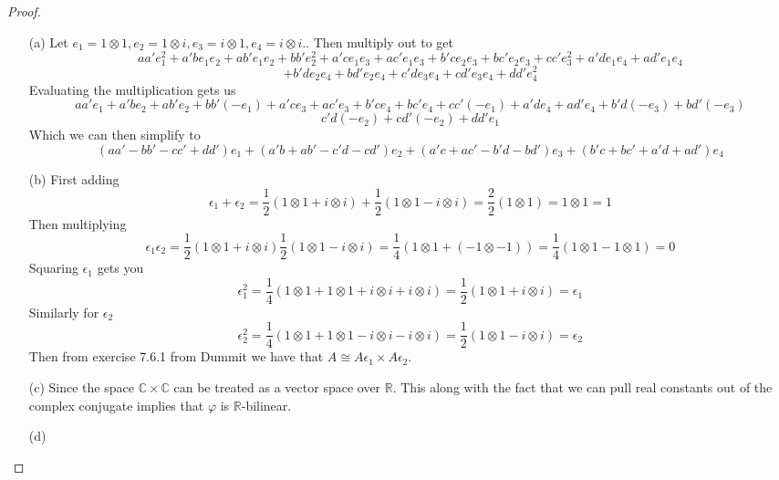 \documentclass[10pt]{article}
\newcommand{\bb}[1]{\mathbb{#1}}
\theoremstyle{plain}
\theoremstyle{remark}
\begin{document}
\begin{proof}
  \begin{enumerate}
  \item[(a)] Let $e_1=1\otimes 1, e_2=1\otimes i, e_3= i\otimes 1, e_4 = i\otimes i. $. Then multiply out to get
    \[
      a a' e_{1}^{2} + a' b e_{1} e_{2} + a b' e_{1} e_{2} + b b' e_{2}^{2} + a' c e_{1} e_{3} + a c' e_{1} e_{3} + b' c e_{2} e_{3} + b c' e_{2} e_{3} + c c' e_{3}^{2} + a' d e_{1} e_{4} + a d' e_{1} e_{4}
    \]
    \[
      + b' d e_{2} e_{4} + b d' e_{2} e_{4} + c' d e_{3} e_{4} + c d' e_{3} e_{4} + d d' e_{4}^{2}
    \]
    Evaluating the multiplication gets us
    \[
      aa'e_1+a'be_2+ab'e_2 +bb'(-e_1)+a'ce_3+ac'e_3+b'ce_4+bc'e_4+cc'(-e_1)+a'de_4+ad'e_4+b'd(-e_3)+bd'(-e_3)
    \]
    \[
      c'd(-e_2)+cd'(-e_2)+dd'e_1
    \]
    Which we can then simplify to
    \[
      (aa'-bb'-cc'+dd')e_1+(a'b+ab'-c'd-cd')e_2+(a'c+ac'-b'd-bd')e_3+(b'c+bc'+a'd+ad')e_4
    \]
  \item[(b)] First adding
    \[
      \epsilon_1+\epsilon_2=\frac{1}{2}(1\otimes 1+i\otimes i)+\frac{1}{2}(1\otimes 1-i\otimes i)=\frac{2}{2}(1\otimes 1)=1\otimes 1=1
    \]
    Then multiplying
    \[
      \epsilon_1 \epsilon_2=\frac{1}{2}(1\otimes 1+i\otimes i)\frac{1}{2}(1\otimes 1-i\otimes i)=\frac{1}{4}(1\otimes 1+(-1\otimes -1))=\frac{1}{4}(1\otimes 1-1\otimes 1)=0
    \]
    Squaring $\epsilon_1$ gets you
    \[
      \epsilon_1^2=\frac{1}{4}(1\otimes 1+1\otimes 1+i\otimes i +i\otimes i)=\frac{1}{2}(1\otimes 1+i\otimes i)=\epsilon_1
    \]
    Similarly for $\epsilon_2$
    \[
      \epsilon_2^2=\frac{1}{4}(1\otimes 1+1\otimes 1-i\otimes i -i\otimes i)=\frac{1}{2}(1\otimes 1-i\otimes i)=\epsilon_2
    \]
    Then from exercise 7.6.1 from Dummit we have that $A\cong A\epsilon_1\times A\epsilon_2$.
  \item[(c)] Since the space $\bb{C}\times \bb{C}$ can be treated as a vector
    space over $\bb{R}$. This along with the fact that we can pull
    real constants out of the complex conjugate implies that $\varphi$ is
    $\bb{R}$-bilinear.
  \item[(d)]
  \end{enumerate}
\end{proof}

\end{document}
